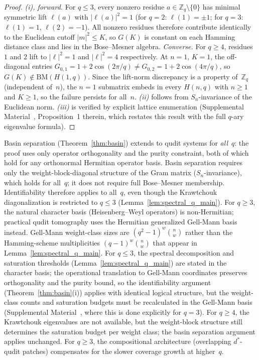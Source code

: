\documentclass[twocolumn,prx,aps,superscriptaddress,longbibliography,floatfix]{revtex4-2}
\begin{document}
\begin{proof}
\emph{(i), forward.}
For $q \le 3$, every nonzero residue $a \in \mathbb{Z}_q
\setminus \{0\}$ has minimal symmetric lift $\ell(a)$ with
$|\ell(a)|^2 = 1$ (for $q = 2$: $\ell(1) = \pm 1$; for
$q = 3$: $\ell(1) = 1$, $\ell(2) = -1$).
All nonzero residues therefore contribute identically to the
Euclidean cutoff $|m|^2 \le K$, so $G(K)$ is constant on
each Hamming distance class and lies in the Bose--Mesner algebra.
\emph{Converse.}
For $q \ge 4$, residues $1$ and $2$ lift to
$|\ell|^2 = 1$ and $|\ell|^2 = 4$ respectively.
At $n = 1$, $K = 1$, the off-diagonal entries
$G_{0,1} = 1 + 2\cos(2\pi/q) \neq G_{0,2} = 1 + 2\cos(4\pi/q)$,
so $G(K) \notin \mathrm{BM}(H(1,q))$.
Since the lift-norm discrepancy is a property of~$\mathbb{Z}_q$
(independent of~$n$), the $n = 1$ submatrix embeds in every
$H(n,q)$ with $n \ge 1$ and $K \ge 1$, so the failure
persists for all~$n$.
\emph{(ii)} follows from $S_n$-invariance of the Euclidean norm.
\emph{(iii)} is verified by explicit lattice enumeration
(Supplemental Material~\cite{supplemental}, Proposition~1 therein,
which restates this result with the full $q$-ary eigenvalue formula).
\end{proof}

Basin separation (Theorem~\ref{thm:basin}) extends
to qudit systems for \emph{all}~$q$: the proof uses only operator
orthogonality and the purity constraint, both of which hold for
any orthonormal Hermitian operator basis.
Basin separation requires only the
weight-block-diagonal structure of the Gram matrix
($S_n$-invariance), which holds for all~$q$; it does not require
full Bose--Mesner membership.
Identifiability therefore applies to all~$q$, even
though the Krawtchouk diagonalization is restricted to $q \le 3$
(Lemma~\ref{lem:spectral_q_main}).
For $q \ge 3$, the natural character basis
(Heisenberg--Weyl operators) is non-Hermitian; practical qudit
tomography uses the Hermitian generalized Gell-Mann basis instead.
Gell-Mann weight-class sizes are $(q^2{-}1)^w \binom{n}{w}$
rather than the Hamming-scheme multiplicities $(q{-}1)^w \binom{n}{w}$
that appear in Lemma~\ref{lem:spectral_q_main}.
For $q \le 3$, the spectral decomposition and saturation thresholds
(Lemma~\ref{lem:spectral_q_main}) are stated in the character
basis; the operational translation to Gell-Mann coordinates
preserves orthogonality and the purity bound, so the
identifiability argument (Theorem~\ref{thm:basin}(i))
applies with identical logical structure, but the
weight-class counts
and saturation budgets must be recalculated in the Gell-Mann basis
(Supplemental Material~\cite{supplemental}, where this is done
explicitly for $q = 3$).
For $q \ge 4$, the Krawtchouk eigenvalues are not available, but
the weight-block structure still determines the saturation budget
per weight class; the basin separation argument applies unchanged.
For $q \ge 3$, the compositional architecture
(overlapping $d^*$-qudit patches) compensates for the
slower coverage growth at higher~$q$.
\end{document}
